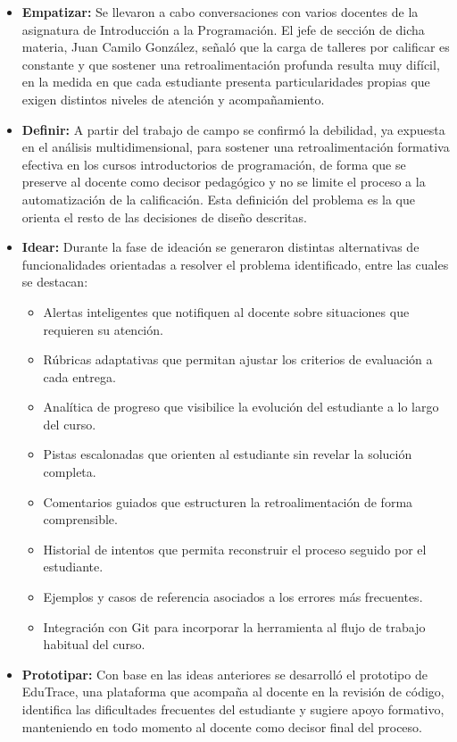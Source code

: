 \documentclass[letterpaper, 10 pt, conference]{ieeeconf}
\begin{document}
\begin{itemize}
	\item \textbf{Empatizar:} Se llevaron a cabo conversaciones con varios docentes de la asignatura de Introducción a la Programación. El jefe de sección de dicha materia, Juan Camilo González, señaló que la carga de talleres por calificar es constante y que sostener una retroalimentación profunda resulta muy difícil, en la medida en que cada estudiante presenta particularidades propias que exigen distintos niveles de atención y acompañamiento.
	\item \textbf{Definir:} A partir del trabajo de campo se confirmó la debilidad, ya expuesta en el análisis multidimensional, para sostener una retroalimentación formativa efectiva en los cursos introductorios de programación, de forma que se preserve al docente como decisor pedagógico y no se limite el proceso a la automatización de la calificación. Esta definición del problema es la que orienta el resto de las decisiones de diseño descritas.
	\item \textbf{Idear:} Durante la fase de ideación se generaron distintas alternativas de funcionalidades orientadas a resolver el problema identificado, entre las cuales se destacan:
	\begin{itemize}
		\item Alertas inteligentes que notifiquen al docente sobre situaciones que requieren su atención.
		\item Rúbricas adaptativas que permitan ajustar los criterios de evaluación a cada entrega.
		\item Analítica de progreso que visibilice la evolución del estudiante a lo largo del curso.
		\item Pistas escalonadas que orienten al estudiante sin revelar la solución completa.
		\item Comentarios guiados que estructuren la retroalimentación de forma comprensible.
		\item Historial de intentos que permita reconstruir el proceso seguido por el estudiante.
		\item Ejemplos y casos de referencia asociados a los errores más frecuentes.
		\item Integración con Git para incorporar la herramienta al flujo de trabajo habitual del curso.
	\end{itemize}
	\item \textbf{Prototipar:} Con base en las ideas anteriores se desarrolló el prototipo de EduTrace, una plataforma que acompaña al docente en la revisión de código, identifica las dificultades frecuentes del estudiante y sugiere apoyo formativo, manteniendo en todo momento al docente como decisor final del proceso.

\end{itemize}
\end{document}
